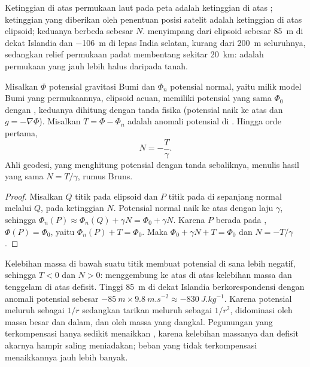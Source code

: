 Ketinggian di atas permukaan laut pada peta adalah ketinggian di atas ; ketinggian yang diberikan oleh penentuan posisi satelit adalah ketinggian di atas elipsoid; keduanya berbeda sebesar $N$.  menyimpang dari elipsoid sebesar \qty{+85}{m} di dekat Islandia dan \qty{-106}{m} di lepas India selatan, kurang dari \qty{200}{m} seluruhnya, sedangkan relief permukaan padat membentang sekitar \qty{20}{km}:  adalah permukaan yang jauh lebih halus daripada tanah.

\begin{proposition}\label{prop:b1:isostasy-gravity:bruns}
Misalkan $\Phi$ potensial gravitasi Bumi dan $\Phi_n$ potensial normal, yaitu milik model Bumi yang permukaannya, elipsoid acuan, memiliki potensial yang sama $\Phi_0$ dengan , keduanya dihitung dengan tanda fisika (potensial naik ke atas dan $g = -\nabla\Phi$). Misalkan $T = \Phi - \Phi_n$ adalah anomali potensial di . Hingga orde pertama,
\[
  N = -\frac{T}{\gamma} .
\]
Ahli geodesi, yang menghitung potensial dengan tanda sebaliknya, menulis hasil yang sama $N = T/\gamma$, rumus Bruns.
\end{proposition}

\begin{proof}
Misalkan $Q$ titik pada elipsoid dan $P$ titik pada  di sepanjang normal melalui $Q$, pada ketinggian $N$. Potensial normal naik ke atas
dengan laju $\gamma$, sehingga $\Phi_n(P) \approx \Phi_n(Q) + \gamma N = \Phi_0 +
\gamma N$. Karena $P$ berada pada , $\Phi(P) = \Phi_0$, yaitu
$\Phi_n(P) + T = \Phi_0$. Maka $\Phi_0 + \gamma N + T = \Phi_0$ dan $N =
-T/\gamma$.
\end{proof}

Kelebihan massa di bawah suatu titik membuat potensial di sana lebih negatif, sehingga $T < 0$ dan $N > 0$:  menggembung ke atas di atas kelebihan massa dan tenggelam di atas defisit. Tinggi \qty{85}{m} di dekat Islandia berkorespondensi dengan anomali potensial sebesar $-\qty{85}{m}\times\qty{9.8}{m.s^{-2}} \approx \qty{-830}{J.kg^{-1}}$.
Karena potensial meluruh sebagai $1/r$ sedangkan tarikan meluruh sebagai $1/r^2$,  didominasi oleh massa besar dan dalam, dan  oleh massa yang dangkal. Pegunungan yang terkompensasi hanya sedikit menaikkan , karena kelebihan massanya dan defisit akarnya hampir saling meniadakan; beban yang tidak terkompensasi menaikkannya jauh lebih banyak.

